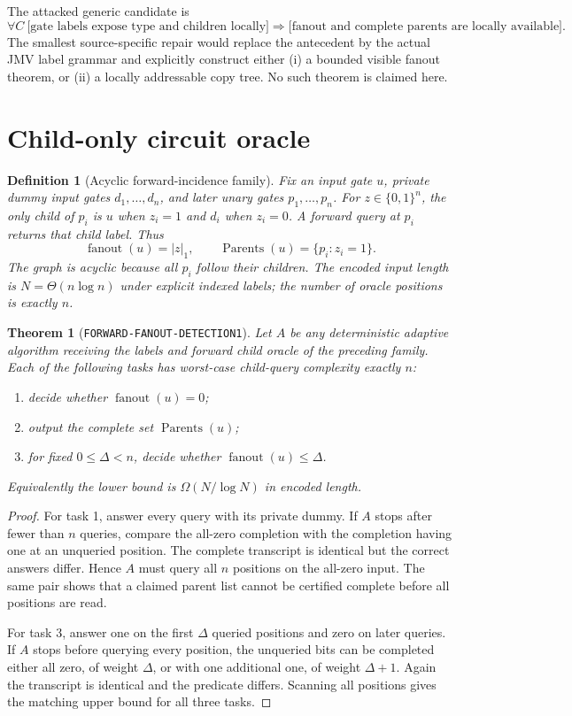 \documentclass[11pt]{article}
\newtheorem{definition}{Definition}
\newtheorem{theorem}{Theorem}
\begin{document}
The attacked generic candidate is
\[
 \forall C\ \bigl[\text{gate labels expose type and children locally}\bigr]
 \Longrightarrow
 \bigl[\text{fanout and complete parents are locally available}\bigr].
\tag{CF}
\]
The smallest source-specific repair would replace the antecedent by the
actual JMV label grammar and explicitly construct either (i) a bounded
visible fanout theorem, or (ii) a locally addressable copy tree.  No such
theorem is claimed here.

\section{Child-only circuit oracle}

\begin{definition}[Acyclic forward-incidence family]
Fix an input gate $u$, private dummy input gates $d_1,\ldots,d_n$, and
later unary gates $p_1,\ldots,p_n$.  For $z\in\{0,1\}^n$, the only child of
$p_i$ is $u$ when $z_i=1$ and $d_i$ when $z_i=0$.  A forward query at
$p_i$ returns that child label.  Thus
\[
 \operatorname{fanout}(u)=|z|_1,
 \qquad
 \operatorname{Parents}(u)=\{p_i:z_i=1\}.
\]
The graph is acyclic because all $p_i$ follow their children.  The encoded
input length is $N=\Theta(n\log n)$ under explicit indexed labels; the
number of oracle positions is exactly $n$.
\end{definition}

\begin{theorem}[\texttt{FORWARD-FANOUT-DETECTION1}]
Let $A$ be any deterministic adaptive algorithm receiving the labels and
forward child oracle of the preceding family.  Each of the following tasks
has worst-case child-query complexity exactly $n$:
\begin{enumerate}[nosep]
\item decide whether $\operatorname{fanout}(u)=0$;
\item output the complete set $\operatorname{Parents}(u)$;
\item for fixed $0\le\Delta<n$, decide whether
      $\operatorname{fanout}(u)\le\Delta$.
\end{enumerate}
Equivalently the lower bound is $\Omega(N/\log N)$ in encoded length.
\end{theorem}

\begin{proof}
For task 1, answer every query with its private dummy.  If $A$ stops after
fewer than $n$ queries, compare the all-zero completion with the completion
having one at an unqueried position.  The complete transcript is identical
but the correct answers differ.  Hence $A$ must query all $n$ positions on
the all-zero input.  The same pair shows that a claimed parent list cannot
be certified complete before all positions are read.

For task 3, answer one on the first $\Delta$ queried positions and zero on
later queries.  If $A$ stops before querying every position, the unqueried
bits can be completed either all zero, of weight $\Delta$, or with one
additional one, of weight $\Delta+1$.  Again the transcript is identical and
the predicate differs.  Scanning all positions gives the matching upper
bound for all three tasks.
\end{proof}
\end{document}
